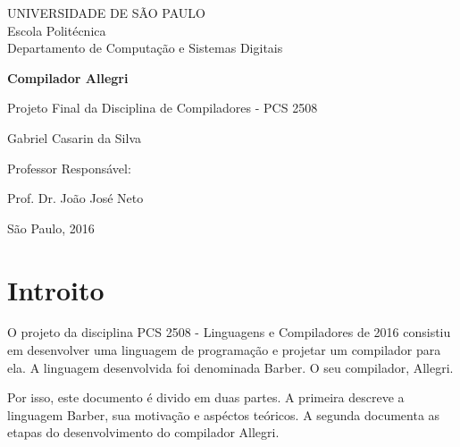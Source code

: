 \documentclass[a4paper,12pt]{report}
\begin{document}
    \begin{titlepage}
        \begin{center}

            UNIVERSIDADE DE SÃO PAULO\\
            Escola Politécnica\\
            Departamento de Computação e Sistemas Digitais
            \vspace{8cm}
            
            \Huge
            \textbf{Compilador Allegri}
            
            \vspace{0.5cm}
            \large
            Projeto Final da Disciplina de Compiladores - PCS 2508
            
            \vspace{2.5cm}
            \Large
            Gabriel Casarin da Silva
            
        \end{center}
        
        \vspace{3.0cm}
        \setlength{\parindent}{10.5cm}
        \large Professor Responsável:

        \setlength{\parindent}{10.5cm}
        Prof. Dr. João José Neto
        

        \begin{center}
            \vfill
            \large
            São Paulo, 2016
        \end{center}
            
    \end{titlepage}
        

    \tableofcontents
    \newpage
    \chapter*{Introito}
    O projeto da disciplina PCS 2508 - Linguagens e Compiladores de 2016 consistiu em desenvolver uma linguagem de programação e projetar um compilador para ela. A linguagem desenvolvida foi denominada Barber. O seu compilador, Allegri.

    Por isso, este documento é divido em duas partes. A primeira descreve a linguagem Barber, sua motivação e aspéctos teóricos. A segunda documenta as etapas do desenvolvimento do compilador Allegri.
\end{document}
